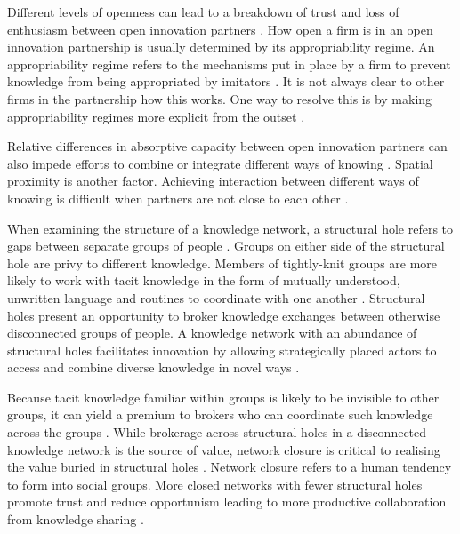 Different levels of openness can lead to a breakdown of trust and loss of enthusiasm between open innovation partners \citep{laursen2014paradox,dragsdahl2019perspective}. How open a firm is in an open innovation partnership is usually determined by its appropriability regime. An appropriability regime refers to the mechanisms put in place by a firm to prevent knowledge from being appropriated by imitators \citep{teece1998capturing,hurmelinna2008appropriability}. It is not always clear to other firms in the partnership how this works. One way to resolve this is by making appropriability regimes more explicit from the outset \citep{gama2019managing}. \medskip

Relative differences in absorptive capacity between open innovation partners can also impede efforts to combine or integrate different ways of knowing \citep{vanhaverbeke2007connecting,lichtenthaler2016absorptive}. Spatial proximity is another factor. Achieving interaction between different ways of knowing is difficult when partners are not close to each other \citep{wineman2009spatial,roper2018knowledge}. \medskip

When examining the structure of a knowledge network, a structural hole refers to gaps between separate groups of people \citep{burt2000network}. Groups on either side of the structural hole are privy to different knowledge. Members of tightly-knit groups are more likely to work with tacit knowledge in the form of mutually understood, unwritten language and routines to coordinate with one another \citep{burt2007secondhand}. Structural holes present an opportunity to broker knowledge exchanges between otherwise disconnected groups of people. A knowledge network with an abundance of structural holes facilitates innovation by allowing strategically placed actors to access and combine diverse knowledge in novel ways \citep{burt2004structural,sparrowe2011publishing}. \medskip

Because tacit knowledge familiar within groups is likely to be invisible to other groups, it can yield a premium to brokers who can coordinate such knowledge across the groups \citep{burt2007secondhand}. While brokerage across structural holes in a disconnected knowledge network is the source of value, network closure is critical to realising the value buried in structural holes \citep{burt2004structural,rost2011strength}. Network closure refers to a human tendency to form into social groups. More closed networks with fewer structural holes promote trust and reduce opportunism leading to more productive collaboration from knowledge sharing \citep{ahuja2000collaboration}. \medskip

